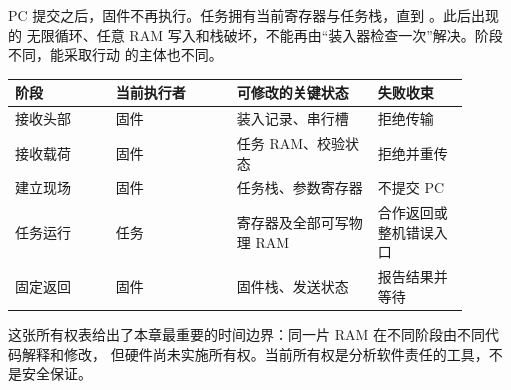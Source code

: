 PC 提交之后，固件不再执行。任务拥有当前寄存器与任务栈，直到 。此后出现的
无限循环、任意 RAM 写入和栈破坏，不能再由“装入器检查一次”解决。阶段不同，能采取行动
的主体也不同。

\begin{longtable}{|L{0.20\linewidth}|L{0.24\linewidth}|L{0.28\linewidth}|L{0.18\linewidth}|}
\hline
{}
阶段 & 当前执行者 & 可修改的关键状态 & 失败收束 \\ \hline
接收头部 & 固件 & 装入记录、串行槽 & 拒绝传输 \\ \hline
接收载荷 & 固件 & 任务 RAM、校验状态 & 拒绝并重传 \\ \hline
建立现场 & 固件 & 任务栈、参数寄存器 & 不提交 PC \\ \hline
任务运行 & 任务 & 寄存器及全部可写物理 RAM & 合作返回或整机错误入口 \\ \hline
固定返回 & 固件 & 固件栈、发送状态 & 报告结果并等待 \\ \hline
\end{longtable}

这张所有权表给出了本章最重要的时间边界：同一片 RAM 在不同阶段由不同代码解释和修改，
但硬件尚未实施所有权。当前所有权是分析软件责任的工具，不是安全保证。
